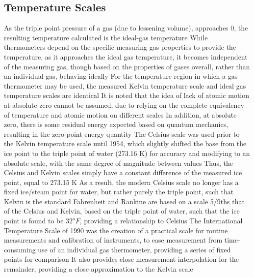 \documentclass[11 pt, twoside]{article}
\newenvironment{outline*}
{
	\begin{outline}[enumerate]
	}
	{\end{outline}
}
\begin{document}
\subsection{Temperature Scales}
\begin{outline*}
\1 As the triple point pressure of a gas (due to lessening volume), approaches 0, the resulting temperature calculated is the ideal-gas temperature
\2 While thermometers depend on the specific measuring gas properties to provide the temperature, as it approaches the ideal gas temperature, it becomes independent of the measuring gas, though based on the properties of gases overall, rather than an individual gas, behaving ideally
\2 For the temperature region in which a gas thermometer may be used, the measured Kelvin temperature scale and ideal gas temperature scales are identical
\2 It is noted that the idea of lack of atomic motion at absolute zero cannot be assumed, due to relying on the complete equivalency of temperature and atomic motion on different scales 
\3 In addition, at absolute zero, there is some residual energy expected based on quantum mechanics, resulting in the zero-point energy quantity
\1 The Celsius scale was used prior to the Kelvin temperature scale until 1954, which slightly shifted the base from the ice point to the triple point of water (273.16 K) for accuracy and modifying to an absolute scale, with the same degree of magnitude between values
\2 Thus, the Celsius and Kelvin scales simply have a constant difference of the measured ice point, equal to 273.15 K
\2 As a result, the modern Celsius scale no longer has a fixed ice/steam point for water, but rather purely the triple point, such that Kelvin is the standard
\1 Fahrenheit and Rankine are based on a scale 5/9ths that of the Celsius and Kelvin, based on the triple point of water, such that the ice point is found to be $32^o F$, providing a relationship to Celsius
\1 The International Temperature Scale of 1990 was the creation of a practical scale for routine measurements and calibration of instruments, to ease measurement from time-consuming use of an individual gas thermometer, providing a series of fixed points for comparison
\2 It also provides close measurement interpolation for the remainder, providing a close approximation to the Kelvin scale
\2 
\end{outline*}
\end{document}
